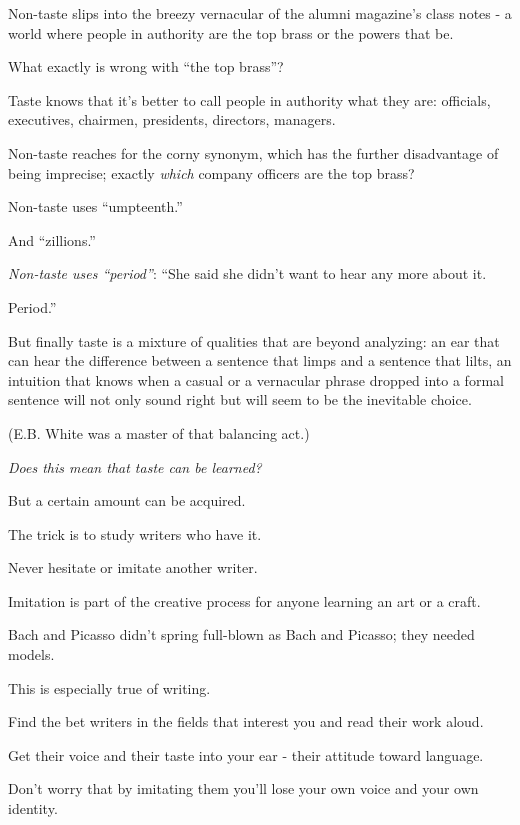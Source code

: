 \documentclass{book}
\numberwithin{equation}{section}
\begin{document}
Non-taste slips into the breezy vernacular of the alumni magazine's class notes - a world where people in authority are the top brass or the powers that be.

What exactly is wrong with ``the top brass''?


Taste knows that it's better to call people in authority what they are: officials, executives, chairmen, presidents, directors, managers.

Non-taste reaches for the corny synonym, which has the further disadvantage of being imprecise; exactly \textit{which} company officers are the top brass?

Non-taste uses ``umpteenth.''

And ``zillions.''

\textit{Non-taste uses ``period''}: ``She said she didn't want to hear any more about it.

Period.''

%
But finally taste is a mixture of qualities that are beyond analyzing: an ear that can hear the difference between a sentence that limps and a sentence that lilts, an intuition that knows when a casual or a vernacular phrase dropped into a formal sentence will not only sound right but will seem to be the inevitable choice.

(E.B. White was a master of that balancing act.)

\textit{Does this mean that taste can be learned?}



But a certain amount can be acquired.

The trick is to study writers who have it.

%
Never hesitate or imitate another writer.

Imitation is part of the creative process for anyone learning an art or a craft.

Bach and Picasso didn't spring full-blown as Bach and Picasso; they needed models.

This is especially true of writing.

Find the bet writers in the fields that interest you and read their work aloud.

Get their voice and their taste into your ear - their attitude toward language.

Don't worry that by imitating them you'll lose your own voice and your own identity.
\end{document}
